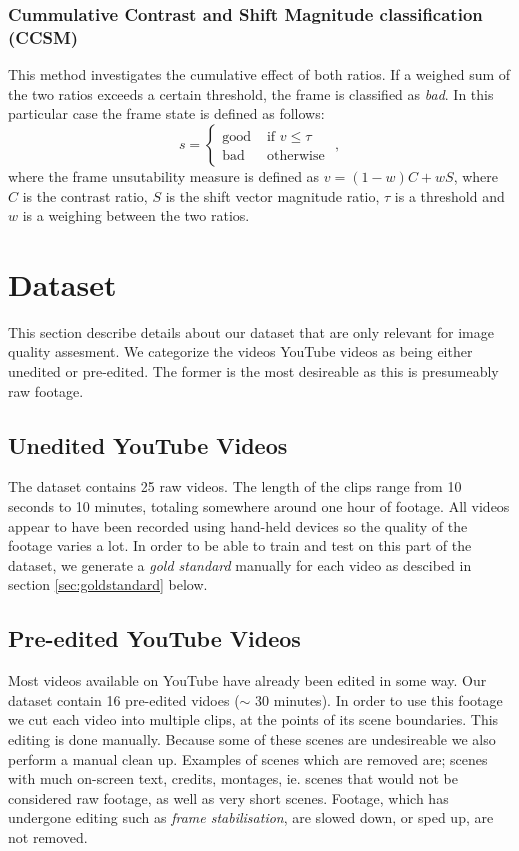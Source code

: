 \subsubsection{Cummulative Contrast and Shift Magnitude classification (CCSM)}
%
This method investigates the cumulative effect of both ratios. If a weighed sum of the two ratios exceeds a certain threshold, the frame is classified as \textit{bad}. In this particular case the frame state is defined as follows:\\
%
\[
s = 
\begin{cases}
\text{good} & \text{ if } v \leq \tau\\
\text{bad} & \text{ otherwise }
\end{cases},
\]
%
where the frame unsutability measure is defined as $v=(1-w) C + w S$, where $C$ is the contrast ratio, $S$ is the shift vector magnitude ratio, $\tau$ is a threshold and $w$ is a weighing between the two ratios.
%
\section{Dataset}
%
This section describe details about our dataset that are only relevant for image quality assesment. We categorize the videos YouTube videos as being either unedited or pre-edited. The former is the most desireable as this is presumeably raw footage.
%
\subsection{Unedited YouTube Videos}
%
The dataset contains 25 raw videos. The length of the clips range from 10 seconds to 10 minutes, totaling somewhere around one hour of footage. All videos appear to have been recorded using hand-held devices so the quality of the footage varies a lot. In order to be able to train and test on this part of the dataset, we generate a \textit{gold standard} manually for each video as descibed in section \ref{sec:goldstandard} below.
%
\subsection{Pre-edited YouTube Videos}\label{ph1:preeditedyoutube}
%
Most videos available on YouTube have already been edited in some way. Our dataset contain 16 pre-edited vidoes ($\sim$ 30 minutes). In order to use this footage we cut each video into multiple clips, at the points of its scene boundaries. This editing is done manually. Because some of these scenes are undesireable we also perform a manual clean up. Examples of scenes which are removed are; scenes with much on-screen text, credits, montages, ie. scenes that would not be considered raw footage, as well as very short scenes. Footage, which has undergone editing such as \textit{frame stabilisation}, are slowed down, or sped up, are not removed.
%
